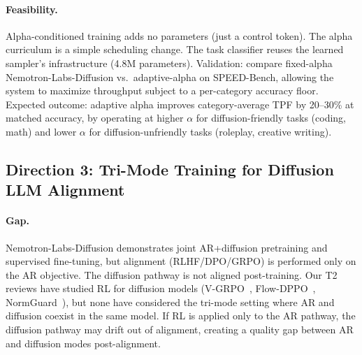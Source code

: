 \documentclass[11pt,a4paper]{article}
\begin{document}
\paragraph{Feasibility.} Alpha-conditioned training adds no parameters (just a control token). The alpha curriculum is a simple scheduling change. The task classifier reuses the learned sampler's infrastructure (4.8M parameters). Validation: compare fixed-alpha Nemotron-Labs-Diffusion vs.\ adaptive-alpha on SPEED-Bench, allowing the system to maximize throughput subject to a per-category accuracy floor. Expected outcome: adaptive alpha improves category-average TPF by 20--30\% at matched accuracy, by operating at higher $\alpha$ for diffusion-friendly tasks (coding, math) and lower $\alpha$ for diffusion-unfriendly tasks (roleplay, creative writing).

\subsection{Direction 3: Tri-Mode Training for Diffusion LLM Alignment}

\paragraph{Gap.} Nemotron-Labs-Diffusion demonstrates joint AR+diffusion pretraining and supervised fine-tuning, but alignment (RLHF/DPO/GRPO) is performed only on the AR objective. The diffusion pathway is not aligned post-training. Our T2 reviews have studied RL for diffusion models (V-GRPO~\cite{vgrpo2026}, Flow-DPPO~\cite{flowdppo2026}, NormGuard~\cite{normguard2026}), but none have considered the tri-mode setting where AR and diffusion coexist in the same model. If RL is applied only to the AR pathway, the diffusion pathway may drift out of alignment, creating a quality gap between AR and diffusion modes post-alignment.
\end{document}
